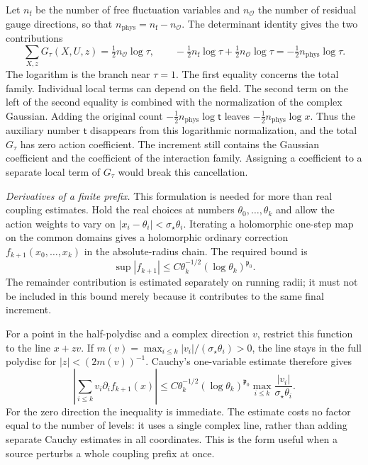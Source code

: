 \documentclass[11pt,letterpaper,reqno]{amsart}
\theoremstyle{definition}
\theoremstyle{remark}
\begin{document}
Let $n_{\mathrm f}$ be the number of free fluctuation variables and
$n_{\mathcal O}$ the number of residual gauge directions, so that
$n_{\mathrm{phys}}=n_{\mathrm f}-n_{\mathcal O}$. The determinant
identity gives the two contributions
\begin{equation}\label{eq:rg-weight-count}
 \sum_{X,z}G_\tau(X,U,z)
       =\tfrac12n_{\mathcal O}\log\tau,\qquad
 -\tfrac12n_{\mathrm f}\log\tau
       +\tfrac12n_{\mathcal O}\log\tau
       =-\tfrac12n_{\mathrm{phys}}\log\tau.
\end{equation}
The logarithm is the branch near $\tau=1$. The first equality concerns
the total family. Individual local terms can depend on the field.
The second term on the left of the second equality is combined with
the normalization of the complex Gaussian. Adding the original count
$-\tfrac12n_{\mathrm{phys}}\log\mathsf t$ leaves
$-\tfrac12n_{\mathrm{phys}}\log x$. Thus the auxiliary number
$\mathsf t$ disappears from this logarithmic normalization, and the
total $G_\tau$ has zero action coefficient. The increment still
contains the Gaussian coefficient and the coefficient of the
interaction family. Assigning a coefficient to a separate local term
of $G_\tau$ would break this cancellation.

\emph{Derivatives of a finite prefix.}
This formulation is needed for more than real coupling estimates.
Hold the real choices at numbers $\theta_0,\ldots,\theta_k$ and
allow the action weights to vary on
$|x_i-\theta_i|<\sigma_\star\theta_i$. Iterating a holomorphic
one-step map on the common domains gives a holomorphic ordinary
correction $f_{k+1}(x_0,\ldots,x_k)$ in the absolute-radius chain.
The required bound is
\[
 \sup|f_{k+1}|\le
 C\theta_k^{-1/2}(\log\theta_k)^{\mathfrak p_0}.
\]
The remainder contribution is estimated separately on running radii;
it must not be included in this bound merely because it contributes
to the same final increment.

For a point in the half-polydisc and a complex direction $v$, restrict
this function to the line $x+zv$. If
$m(v)=\max_{i\le k}|v_i|/(\sigma_\star\theta_i)>0$, the line
stays in the full polydisc for $|z|<(2m(v))^{-1}$. Cauchy's
one-variable estimate therefore gives
\begin{equation}\label{eq:rg-directional-cauchy}
 \left|\sum_{i\le k}v_i\partial_i f_{k+1}(x)\right|
 \le C\theta_k^{-1/2}(\log\theta_k)^{\mathfrak p_0}
                  \max_{i\le k}\frac{|v_i|}{\sigma_\star\theta_i}.
\end{equation}
For the zero direction the inequality is immediate. The estimate
costs no factor equal to the number of levels: it uses a single
complex line, rather than adding separate Cauchy estimates in all
coordinates. This is the form useful when a source perturbs a whole
coupling prefix at once.
\end{document}
